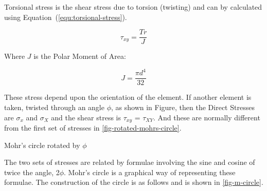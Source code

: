 Torsional stress is the shear stress due to torsion (twisting) and can by calculated using Equation~(\ref{equ:torsional-stress}).

\begin{equation}
  \tau_{xy} = \frac{Tr}{J}
  \label{equ:torsional-stress}
\end{equation}

Where \(J\) is the Polar Moment of Area:

\begin{equation}
  J = \frac{\pi d^4}{32}
\end{equation}

These stress depend upon the orientation of the element. If another element is taken, twisted through an angle \(\phi\), as shown in Figure, then the Direct Stresses are \(\sigma_x\) and \(\sigma_X\) and the shear stress is \(\tau_{xy}\) = \(\tau_{XY}\). And these are normally different from the first set of stresses in \cref{fig-rotated-mohrs-circle}.

\begin{marginfigure}
  \center{}
  \caption{Mohr's circle rotated by \(\phi\)}
  \label{fig-rotated-mohrs-circle}
\end{marginfigure}

The two sets of stresses are related by formulae involving the sine and cosine of twice the angle, 2\(\phi\). Mohr's circle is a graphical way of representing these formulae. The construction of the circle is as follows and is shown in \cref{fig-m-circle}.

